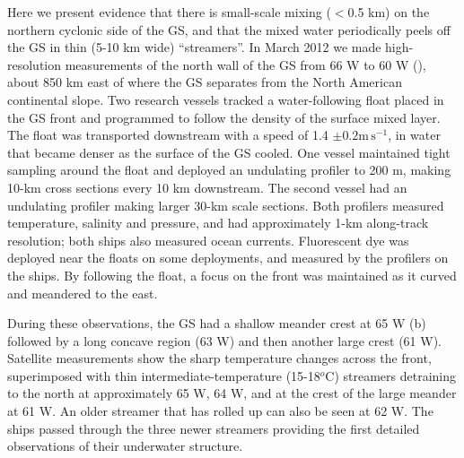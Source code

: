 \documentclass{natureJMK}
\begin{document}

Here we present evidence that there is small-scale mixing ($<$0.5 km)  on the northern cyclonic side of the GS, and that the mixed water periodically peels off the GS in thin (5-10 km wide) ``streamers''.  In March 2012 we made high-resolution measurements of the north wall of the GS from 66 W to 60 W (), about 850 km east of where the GS separates from the North American continental slope.  Two research vessels tracked a water-following float placed in the GS front and programmed to follow the density of the surface mixed layer. The float was transported downstream with a speed of 1.4 $\pm 0.2 \mathrm{m\,s^{-1}}$, in water that became denser  as the surface of the GS cooled.  One vessel maintained tight sampling around the float and deployed an undulating profiler to 200 m, making 10-km cross sections every 10 km downstream.  The second vessel  had an undulating profiler making larger 30-km  scale sections.  Both profilers measured temperature, salinity and pressure, and had approximately 1-km along-track resolution; both ships also measured ocean currents.  Fluorescent dye was deployed near the floats on some deployments, and measured by the profilers on the ships. By following the float, a focus on the front was maintained as it curved and meandered to the east.  

During these observations, the GS had a shallow meander crest at 65 W (b)  followed by a long concave region (63 W) and then another large  crest (61 W).  Satellite measurements show the sharp temperature changes across the front, superimposed with thin intermediate-temperature (15-18$^o$C) streamers detraining to the north at approximately 65 W, 64 W, and at the crest of the large meander at 61 W.  An older streamer that has rolled up can also be seen at 62 W.  The ships passed through the three newer streamers providing the first detailed observations of their underwater structure.  
\end{document}
